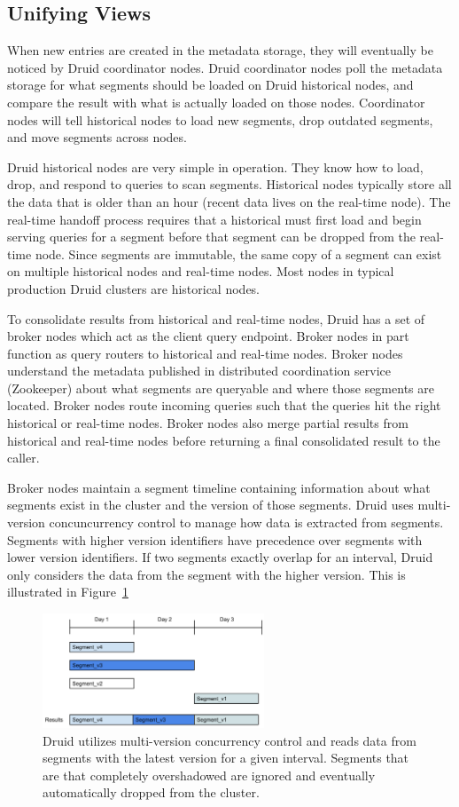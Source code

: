 \documentclass{vldb}
\begin{document}
\subsection{Unifying Views}
When new entries are created in the metadata storage, they will eventually be
noticed by Druid coordinator nodes. Druid coordinator nodes poll the metadata
storage for what segments should be loaded on Druid historical nodes, and
compare the result with what is actually loaded on those nodes. Coordinator
nodes will tell historical nodes to load new segments, drop outdated segments,
and move segments across nodes.

Druid historical nodes are very simple in operation. They know how to load,
drop, and respond to queries to scan segments. Historical nodes typically
store all the data that is older than an hour (recent data lives on the
real-time node). The real-time handoff process requires that a historical must
first load and begin serving queries for a segment before that segment can
be dropped from the real-time node. Since segments are immutable, the same copy
of a segment can exist on multiple historical nodes and real-time nodes. Most
nodes in typical production Druid clusters are historical nodes.

To consolidate results from historical and real-time nodes, Druid has a set of
broker nodes which act as the client query endpoint. Broker nodes in part
function as query routers to historical and real-time nodes. Broker nodes
understand the metadata published in distributed coordination service
(Zookeeper) about what segments are queryable and where those segments are
located. Broker nodes route incoming queries such that the queries hit the
right historical or real-time nodes.  Broker nodes also merge partial results
from historical and real-time nodes before returning a final consolidated
result to the caller.

Broker nodes maintain a segment timeline containing information about what
segments exist in the cluster and the version of those segments. Druid uses
multi-version concuncurrency control to manage how data is extracted from
segments. Segments with higher version identifiers have precedence over
segments with lower version identifiers. If two segments exactly overlap for an
interval, Druid only considers the data from the segment with the higher
version. This is illustrated in Figure~\ref{fig:timeline}

\begin{figure}
\centering
\includegraphics[width = 2.6in]{timeline}
\caption{
Druid utilizes multi-version concurrency control and reads data from segments
with the latest version for a given interval. Segments that are that completely
overshadowed are ignored and eventually automatically dropped from the cluster.
}
\label{fig:timeline}
\end{figure}
\end{document}
